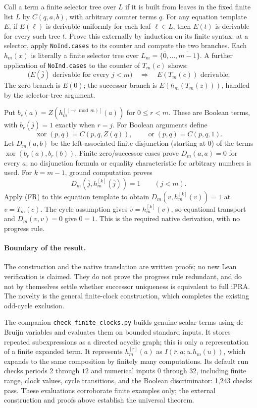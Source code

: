 Call a term a finite selector tree over $L$ if it is built from leaves in
the fixed finite list $L$ by $C(q,a,b)$, with arbitrary counter terms $q$.
For any equation template $E$, if $E(\ell)$ is derivable uniformly for
each leaf $\ell\in L$, then $E(t)$ is derivable for every such tree $t$.
Prove this externally by induction on its finite syntax: at a selector,
apply \texttt{NoInd.cases} to its counter and compute the two branches.
Each $h_m(x)$ is literally a finite selector tree over
$L_m=\{\bar0,\ldots,\overline{m-1}\}$. A further application of
\texttt{NoInd.cases} to the counter of $T_m(c)$ shows:
\[
 \bigl(E(\bar j)\text{ derivable for every }j<m\bigr)
 \quad\Longrightarrow\quad E(T_m(c))\text{ derivable}.
 \tag{FR}
\]
The zero branch is $E(0)$; the successor branch is
$E(h_m(T_m(z)))$, handled by the selector-tree argument.

Put $b_r(a)=Z(h_m^{[(-r\bmod m)]}(a))$ for $0\leq r<m$.
These are Boolean terms, with $b_r(\bar j)=1$ exactly when $r=j$.
For Boolean arguments define
\[
 \operatorname{xor}(p,q)=C(p,q,Z(q)),\qquad
 \operatorname{or}(p,q)=C(p,q,1).
\]
Let $D_m(a,b)$ be the left-associated finite disjunction (starting at
$0$) of the terms $\operatorname{xor}(b_r(a),b_r(b))$.
Finite zero/successor cases prove $D_m(a,a)=0$ for every $a$; no
disjunction formula or equality characteristic for arbitrary numbers is
used. For $k=m-1$, ground computation proves
\[
 D_m(\bar j,h_m^{[k]}(\bar j))=1\qquad(j<m).
\]
Apply (FR) to this equation template to obtain
$D_m(v,h_m^{[k]}(v))=1$ at $v=T_m(c)$. The cycle assumption gives
$v=h_m^{[k]}(v)$, so equational transport and $D_m(v,v)=0$ give
$0=1$. This is the required native derivation, with no progress rule.

\paragraph{Boundary of the result.}
The construction and the native translation are written proofs; no new
Lean verification is claimed. They do not prove the progress rule
redundant, and do not by themselves settle whether successor uniqueness
is equivalent to full iPRA. The novelty is the general finite-clock
construction, which completes the existing odd-cycle exclusion.

The companion \texttt{check\_finite\_clocks.py} builds genuine scalar
terms using de Bruijn variables and evaluates them on bounded standard
inputs. It stores repeated subexpressions as a directed acyclic graph;
this is only a representation of a finite expanded term. It represents
$h_m^{[r]}(a)$ as $I(\bar r,a;u.h_m(u))$, which expands to the same
composition by finitely many computations. Its default run checks
periods $2$ through $12$ and numerical inputs $0$ through $32$, including
finite range, clock values, cycle transitions, and the Boolean
discriminator: 1,243 checks pass. These evaluations corroborate finite
examples only; the external construction and proofs above establish the
universal theorem.
